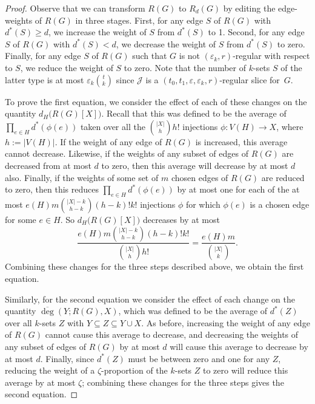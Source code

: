 \documentclass[12pt,a4paper]{amsart}
\let\eps\varepsilon
\newcommand{\cJ}{\mathcal{J}}
\newcommand{\reld}{d^*}
\newcommand{\reldeg}{\overline{\deg}}
\begin{document}
\begin{proof} 
Observe that we can transform $R(G)$ to $R_d(G)$ by editing the edge-weights of
$R(G)$ in three stages. First, for any edge $S$ of $R(G)$ with $\reld(S) \geq
d$, we increase the weight of $S$ from $\reld(S)$ to 1. Second, for any edge
$S$ of $R(G)$ with $\reld(S) < d$, we decrease the weight of $S$ from
$\reld(S)$ to zero. Finally, for any edge $S$ of $R(G)$ such that $G$ is not
$(\eps_k, r)$-regular with respect to $S$, we reduce the weight of $S$ to
zero. Note that the number of $k$-sets $S$ of the latter type is at most $\eps_k \binom{t}{k}$ since $\cJ$ is a $(t_0,t_1,\eps,\eps_k,r)$-regular slice
for~$G$.

To prove the first equation, we consider the effect of each of these changes on the quantity $d_H\big(R(G)[X]\big)$. 
Recall that this was defined to be the average of 
$\prod_{e \in H} \reld(\phi(e))$ taken over all the 
$\binom{|X|}{h}h!$ injections 
$\phi : V(H) \to X$, where $h := |V(H)|$. 
If the weight of any edge of $R(G)$ is increased, this average cannot decrease. 
Likewise, if the weights of any subset of edges of $R(G)$ are decreased from at most $d$ to zero, 
then this average will decrease by at most $d$ also. Finally, if the
weights of some set of $m$ chosen edges of $R(G)$ are reduced to zero, then
this reduces $\prod_{e \in H} \reld(\phi(e))$ by at most one for each of the at
most $e(H) m \binom{|X|-k}{h-k} (h-k)!k!$ injections $\phi$ for which $\phi(e)$
is a chosen edge for some $e \in H$. So $d_H\big(R(G)[X]\big)$ decreases by at
most $$\frac{e(H) m \binom{|X|-k}{h-k} (h-k)!k!}{\binom{|X|}{h}h!} = \frac{e(H)
m }{\binom{|X|}{k}}.$$ Combining these changes for the three steps described
above, we obtain the first equation.

Similarly, for the second equation we consider the effect of each change on the
quantity $\reldeg(Y;R(G), X)$, which was defined to be the average of
$\reld(Z)$ over all $k$-sets $Z$ with $Y \subseteq Z \subseteq Y \cup X$. As
before, increasing the weight of any edge of $R(G)$ cannot cause this average
to decrease, and decreasing the weights of any subset of edges of $R(G)$ by at
most $d$ will cause this average to decrease by at most $d$. Finally, since
$\reld(Z)$ must be between zero and one for any $Z$, reducing the weight of a
$\zeta$-proportion of the $k$-sets $Z$ to zero will reduce this average by at
most $\zeta$; combining these changes for the three steps gives the second equation.
\end{proof} 
\end{document}
